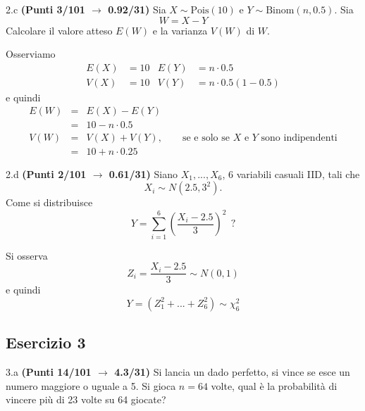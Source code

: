\documentclass[
  11pt,
]{book}
\theoremstyle{mytheoremstyle}
\theoremstyle{mydefstyle}
\newenvironment{sol}
  {
  \begin{tcolorbox}[enhanced,breakable,arc=0.1mm,boxrule=1pt,colback=white,colframe=iblue,
  title=\bf \fontfamily{lmss}\selectfont \hspace{.5 cm} Soluzione,drop fuzzy shadow]

}{
\end{tcolorbox}
  }
\begin{document}
2.c \textbf{(Punti 3/101 \(\rightarrow\) 0.92/31)} Sia \(X\sim \text{Pois}(10)\) e \(Y\sim\text{Binom}(n,0.5)\).
Sia
\[
W=X-Y
\]
Calcolare il valore atteso \(E(W)\) e la varianza \(V(W)\) di \(W\).

\begin{sol}
Osserviamo
\begin{align*}
E(X)&=10 &E(Y)&=n\cdot 0.5\\
V(X)&=10 &V(Y)&=n\cdot0.5(1-0.5)
\end{align*}
e quindi
\begin{eqnarray*}
E(W)&=&E(X)-E(Y)\\
&=&10-n\cdot 0.5\\
V(W)&=&V(X)+V(Y),\qquad\text{se e solo se $X$ e $Y$ sono indipendenti}\\
&=&10+n\cdot 0.25
\end{eqnarray*}

\end{sol}

2.d \textbf{(Punti 2/101 \(\rightarrow\) 0.61/31)} Siano \(X_1,...,X_6\), \(6\) variabili casuali IID,
tali che
\[
X_i\sim N\left(2.5,3^2\right).
\]
Come si distribuisce
\[
Y=\sum_{i=1}^6\left(\frac{X_i-2.5}{3}\right)^2~~?
\]

\begin{sol}
Si osserva
\[
Z_i=\frac{X_i-2.5}{3}\sim N(0,1)
\]
e quindi
\[
Y=(Z_1^2+...+Z_6^2)\sim\chi_6^2
\]

\end{sol}

\subsection{Esercizio 3}\label{esercizio-3-4}

3.a \textbf{(Punti 14/101 \(\rightarrow\) 4.3/31)} Si lancia un dado perfetto, si vince se esce un numero maggiore o uguale a 5.
Si gioca \(n=64\) volte, qual è la probabilità di vincere più di 23 volte su 64 giocate?
\end{document}
